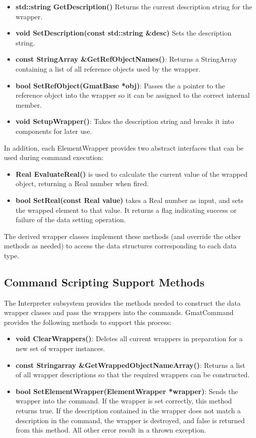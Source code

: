 \begin{itemize}
\item\textbf{std::string GetDescription()} Returns the current description string for the wrapper.
\item\textbf{void SetDescription(const std::string \&desc)} Sets the description string.
\item\textbf{const StringArray \&GetRefObjectNames()}: Returns a StringArray containing a list of
all reference objects used by the wrapper.
\item\textbf{bool SetRefObject(GmatBase *obj)}: Passes the a pointer to the reference object
into the wrapper so it can be assigned to the correct internal member.
\item\textbf{void SetupWrapper()}: Takes the description string and breaks it into components for
later use.
\end{itemize}

In addition, each ElementWrapper provides two abstract interfaces that can be used during command
execution:

\begin{itemize}
\item\textbf{Real EvaluateReal()} is used to calculate the current value of the wrapped
object, returning a Real number when fired.
\item\textbf{bool SetReal(const Real value)} takes a Real number as input, and sets the wrapped
element to that value.  It returns a flag indicating success or failure of the data setting
operation.
\end{itemize}

\noindent The derived wrapper classes implement these methods (and override the other methods as
needed) to access the data structures corresponding to each data type.

\subsection{\label{section:CommandScriptingSupport}Command Scripting Support Methods}

The Interpreter subsystem provides the methods needed to construct the data wrapper classes and
pass the wrappers into the commands.  GmatCommand provides the following methods to support this
process:

\begin{itemize}
\item\textbf{void ClearWrappers()}: Deletes all current wrappers in preparation for a new set of
wrapper instances.
\item\textbf{const Stringarray \&GetWrappedObjectNameArray()}: Returns a list of all wrapper
descriptions so that the required wrappers can be constructed.
\item\textbf{bool SetElementWrapper(ElementWrapper *wrapper)}: Sends the wrapper into the command.
If the wrapper is set correctly, this method returns true.  If the description contained in the
wrapper does not match a description in the command, the wrapper is destroyed, and false is returned
from this method.  All other error result in a thrown exception.
\end{itemize}

